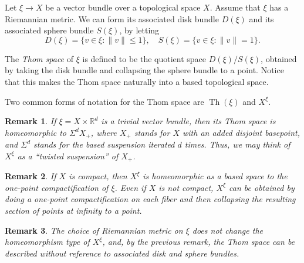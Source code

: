 \documentclass[12pt]{article}
\newcommand{\R}{{\mathbb R}} %
\newcommand{\Th}{\operatorname{Th}}
\newtheorem{rmk}{Remark}
\newcommand{\cross}{\times}
\begin{document}
Let $\xi\to X$ be a vector bundle over a topological space $X$. Assume that $\xi$ has a Riemannian metric. We can form its associated disk bundle $D(\xi)$ and its associated sphere bundle $S(\xi)$, by letting 
$$ D(\xi) = \{v\in\xi: \|v\|\le 1\}, \quad S(\xi) = \{v\in\xi: \|v\|= 1\}. $$

The \emph{Thom space} of $\xi$ is defined to be the quotient space $D(\xi)/S(\xi)$, obtained by taking the disk bundle and collapsing the sphere bundle to a point. Notice that this makes the Thom space naturally into a based topological space.

Two common forms of notation for the Thom space are $\Th(\xi)$ and $X^\xi$.

\begin{rmk}
If $\xi= X\cross \R^d$ is a trivial vector bundle, then its Thom space is homeomorphic to $\Sigma^d X_+$, where $X_+$ stands for $X$ with an added disjoint basepoint, and $\Sigma^d$ stands for the based suspension iterated $d$ times. Thus, we may think of $X^\xi$ as a ``twisted suspension'' of $X_+$.
\end{rmk}

\begin{rmk}
If $X$ is compact, then $X^\xi$ is homeomorphic as a based space to the one-point compactification of $\xi$. Even if $X$ is not compact, $X^\xi$ can be obtained by doing a one-point compactification on each fiber and then collapsing the resulting section of points at infinity to a point.
\end{rmk}

\begin{rmk}
The choice of Riemannian metric on $\xi$ does not change the homeomorphism type of $X^\xi$, and, by the previous remark, the Thom space can be described without reference to associated disk and sphere bundles.
\end{rmk}
\end{document}
